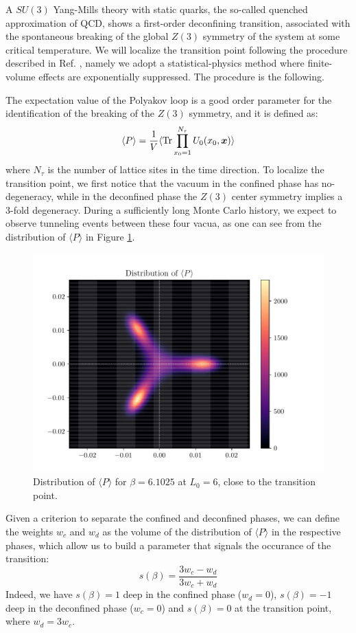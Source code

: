 \documentclass{article}
\begin{document}
A $SU(3)$ Yang-Mills theory with static quarks, the so-called quenched approximation of QCD, shows a first-order deconfining transition, associated with the spontaneous breaking of the global $Z(3)$ symmetry of the system at some critical temperature. %
We will localize the transition point following the procedure described in Ref. \cite{Francis_2015}, namely we adopt a statistical-physics method where finite-volume effects are exponentially suppressed. 
The procedure is the following.%

The expectation value of the Polyakov loop is a good order parameter for the identification of the breaking of the $Z(3)$ symmetry, and it is defined as:
\begin{equation}
    \langle P \rangle = \frac{1}{V} \langle \Tr\prod_{x_0 = 1}^{N_\tau} U_0(x_0, \vb*{x}) \rangle
\end{equation}
where $N_\tau$ is the number of lattice sites in the time direction. %
To localize the transition point, we first notice that the vacuum in the confined phase has no-degeneracy, while in the deconfined phase the $Z(3)$ center symmetry implies a 3-fold degeneracy. During a sufficiently long Monte Carlo history, we expect to observe tunneling events between these four vacua, as one can see from the distribution of $\langle P \rangle$ in Figure \ref{fig:P2d}. %
\begin{figure}[htbp]
    \centering
    \includegraphics[width=0.8\linewidth]{imgs/P_run2.pdf}
    \caption{Distribution of $\langle P \rangle$ for $\beta = 6.1025$ at $L_0=6$, close to the transition point.}
    \label{fig:P2d}
\end{figure}
Given a criterion to separate the confined and deconfined phases, we can define the weights $w_c$ and $w_d$ as the volume of the distribution of $\langle P \rangle$ in the respective phases, which allow us to build a parameter that signals the occurance of the transition:
\begin{equation}
    s(\beta) = \frac{3w_c - w_d}{3w_c + w_d}
\end{equation}
Indeed, we have $s(\beta) = 1$ deep in the confined phase ($w_d = 0$), $s(\beta) = -1$ deep in the deconfined phase ($w_c = 0$) and $s(\beta) = 0$ at the transition point, where $w_d = 3w_c$. %
\end{document}
